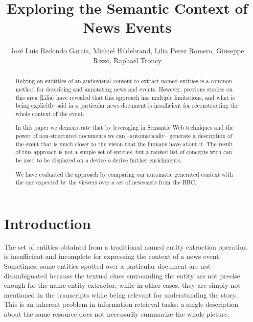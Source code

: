 \documentclass{llncs}
\begin{document}
\frontmatter          %
\pagestyle{headings}  %
\mainmatter              %

\title{Exploring the Semantic Context of News Events}
\author{Jos\'e Luis Redondo Garc\'ia, Michiel Hildebrand, Lilia Perez Romero, Giuseppe Rizzo, Rapha\"el Troncy}


\maketitle              %


\begin{abstract}

Relying on subtitles of an audiovisual content to extract named entities is a common method for describing and annotating news and events. However, previous studies on this area [Lilia] have revealed that this approach has multiple limitations, and what is being explicitly said in a particular news document is insufficient for reconstructing the whole context of the event. 

In this paper we demonstrate that by leveraging in Semantic Web techniques and the power of non-structured documents we can --automatically-- generate a description of the event that is much closer to the vision that the humans have about it. The result of this approach is not a simple set of entities, but a ranked list of concepts wich can be used to be displayed on a device o derive further enrichments.

We have evaluated the approach by comparing our automatic generated context with the one expected by the viewers over a set of newscasts from the BBC.

\end{abstract}


\section{Introduction}
The set of entities obtained from a traditional named entity extraction operation is insufficient and incomplete for expressing the context of a news event. Sometimes, some entities spotted over a particular document are not disambiguated because the textual clues surrounding the entity are not precise enough for the name entity extractor, while in other cases, they are simply not mentioned in the transcripts while being relevant for understanding the story. This is an inherent problem in information retrieval tasks: a single description about the same resource does not necessarily summarize the whole picture.
\end{document}
